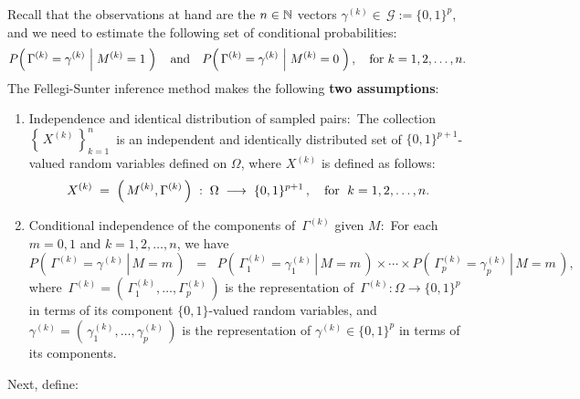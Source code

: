 \vskip 0.5cm
\begin{remark}
\mbox{}\vskip 0.05cm
\noindent
Recall that the observations at hand are the $n \in \mathbb{N}$ vectors $\gamma^{(k)} \in \, \mathcal{G} := \{0,1\}^{p}$, and
we need to estimate the following set of conditional probabilities:
\begin{equation*}
P\!\left(\,
	\Gamma^{(k)}=\gamma^{(k)}\,
	\left\vert\;M^{(k)} = \overset{{\color{white}.}}{1}\right.
	\,\right)
\quad\textnormal{and}\quad
P\!\left(\,
	\Gamma^{(k)}=\gamma^{(k)}\,
	\left\vert\;M^{(k)} = \overset{{\color{white}.}}{0}\right.
	\,\right),
\quad
\textnormal{for $k = 1,2,\ldots,n$}.
\end{equation*}
The Fellegi-Sunter inference method makes the following \textbf{two assumptions}:
\begin{enumerate}
\item
	Independence and identical distribution of sampled pairs:\,
	The collection \,$\left\{\,X^{(k)}\,\right\}_{k=1}^{n}$\, is an
	independent and identically distributed set of $\{0,1\}^{p+1}$-valued
	random variables defined on $\Omega$, where $X^{(k)}$ is defined as follows:
	\begin{equation*}
	X^{(k)} \;=\; \left(\,M^{(k)},\Gamma^{(k)}\,\right) \;:\; \Omega \;\longrightarrow \; \{0,1\}^{p+1}\,,
	\quad
	\textnormal{for \;$k = 1,2,\ldots,n$}.
	\end{equation*}
\item
	Conditional independence of the components of \,$\Gamma^{(k)}$ given $M$:\,
	For each $m = 0,1$ and $k = 1,2,\ldots,n$, we have
	\begin{equation*}
	P\!\left(\,\left.\Gamma^{(k)} = \gamma^{(k)} \,\right\vert\, M = m\,\right)
	\;\; = \;\;
	P\!\left(\,\left.\Gamma^{(k)}_{1} = \gamma^{(k)}_{1} \,\right\vert\, M = m\,\right)
	\times \cdots \times
	P\!\left(\,\left.\Gamma^{(k)}_{p} = \gamma^{(k)}_{p} \,\right\vert\, M = m\,\right),
	\end{equation*}
	where \,$\Gamma^{(k)} = \left(\,\Gamma^{(k)}_{1},\ldots,\Gamma^{(k)}_{p}\,\right)$
	is the representation of \,$\Gamma^{(k)} : \Omega \longrightarrow \{0,1\}^{p}$
	in terms of its component $\{0,1\}$-valued random variables, and
	\,$\gamma^{(k)} = \left(\,\gamma^{(k)}_{1},\ldots,\gamma^{(k)}_{p}\,\right)$
	is the representation of $\gamma^{(k)} \in \{0,1\}^{p}$ in terms of its components.
\end{enumerate}
Next, define:
\begin{equation*}

\end{equation*}
\end{remark}
